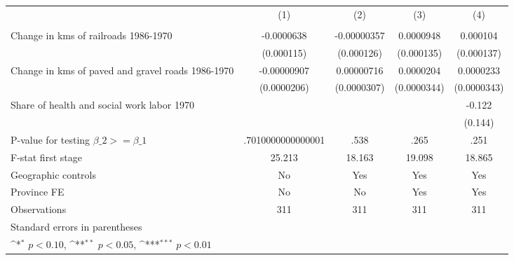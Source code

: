 {
\def\sym#1{\ifmmode^{#1}\else\(^{#1}\)\fi}
\begin{tabular}{l*{4}{c}}
\hline\hline
                &\multicolumn{1}{c}{(1)}&\multicolumn{1}{c}{(2)}&\multicolumn{1}{c}{(3)}&\multicolumn{1}{c}{(4)}\\
                &\multicolumn{1}{c}{}&\multicolumn{1}{c}{}&\multicolumn{1}{c}{}&\multicolumn{1}{c}{}\\
\hline
Change in kms of railroads 1986-1970&-0.0000638         &-0.00000357         &0.0000948         & 0.000104         \\
                &(0.000115)         &(0.000126)         &(0.000135)         &(0.000137)         \\
[1em]
Change in kms of paved and gravel roads 1986-1970&-0.00000907         &0.00000716         &0.0000204         &0.0000233         \\
                &(0.0000206)         &(0.0000307)         &(0.0000344)         &(0.0000343)         \\
[1em]
Share of health and social work labor 1970&                  &                  &                  &   -0.122         \\
                &                  &                  &                  &  (0.144)         \\
\hline
P-value for testing $\beta\_{2} >= \beta\_{1}$&.7010000000000001         &     .538         &     .265         &     .251         \\
F-stat first stage&   25.213         &   18.163         &   19.098         &   18.865         \\
Geographic controls&       No         &      Yes         &      Yes         &      Yes         \\
Province FE     &       No         &       No         &      Yes         &      Yes         \\
Observations    &      311         &      311         &      311         &      311         \\
\hline\hline
\multicolumn{5}{l}{\footnotesize Standard errors in parentheses}\\
\multicolumn{5}{l}{\footnotesize \sym{*} \(p<0.10\), \sym{**} \(p<0.05\), \sym{***} \(p<0.01\)}\\
\end{tabular}
}
